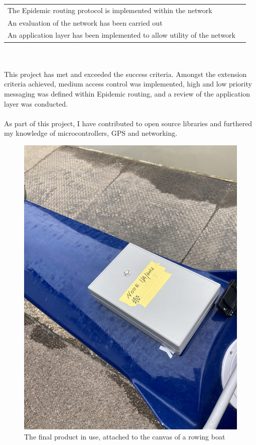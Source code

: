 \documentclass[12pt,a4paper]{report}
\begin{document}
{\begin{tabular}{ll}
The Epidemic routing protocol is implemented within the network\\
An evaluation of the network has been carried out\\
An application layer has been implemented to allow utility of the network \\
\end{tabular} \\ \\
This project has met and exceeded the success criteria. Amongst the extension criteria achieved, medium access control was implemented, high and low priority messaging was defined within Epidemic routing, and a review of the application layer was conducted. \\ \\
As part of this project, I have contributed to open source libraries and furthered my knowledge of microcontrollers, GPS and networking. 

\begin{figure}[h]
\begin{center}
\includegraphics[scale=0.13]{boxOnBoat.jpeg}
\end{center}
\caption{The final product in use, attached to the canvas of a rowing boat}
\end{figure}
\FloatBarrier

}
\end{document}
